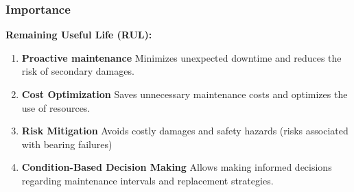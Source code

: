 \documentclass[9pt]{beamer}
\begin{document}
\begin{frame}
\frametitle{Importance}

\textbf{Remaining Useful Life (RUL):}

\begin{enumerate}
    
    \item \textbf{Proactive maintenance} Minimizes unexpected downtime and reduces the risk of secondary damages.
    \item \textbf{Cost Optimization} Saves unnecessary maintenance costs and optimizes the use of resources. %
    \item \textbf{Risk Mitigation} Avoids costly damages and safety hazards (risks associated with bearing failures)
    \item \textbf{Condition-Based Decision Making} Allows making informed decisions regarding maintenance intervals and replacement strategies.
    

 



\end{enumerate}






\end{frame}
\end{document}
